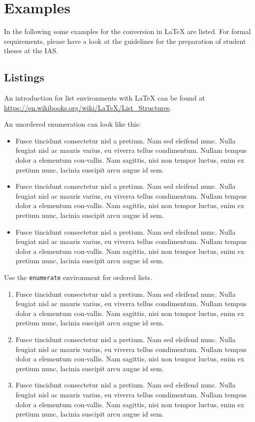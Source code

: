 \chapter{Examples}

In the following some examples for the conversion in \LaTeX{} are listed. For formal requirements, please have a look at the guidelines for the preparation of student theses at the \ac{IAS}.

\section{Listings}

An introduction for list environments with \LaTeX{} can be found at \url{https://en.wikibooks.org/wiki/LaTeX/List_Structures}.

An unordered enumeration can look like this:

\begin{itemize}
    \item Fusce tincidunt consectetur nisl a pretium. Nam sed eleifend nunc. Nulla feugiat nisl ac mauris varius, eu viverra tellus condimentum. Nullam tempus dolor a elementum con-vallis. Nam sagittis, nisi non tempor luctus, enim ex pretium nunc, lacinia suscipit arcu augue id sem.
    \item Fusce tincidunt consectetur nisl a pretium. Nam sed eleifend nunc. Nulla feugiat nisl ac mauris varius, eu viverra tellus condimentum. Nullam tempus dolor a elementum con-vallis. Nam sagittis, nisi non tempor luctus, enim ex pretium nunc, lacinia suscipit arcu augue id sem.
    \item Fusce tincidunt consectetur nisl a pretium. Nam sed eleifend nunc. Nulla feugiat nisl ac mauris varius, eu viverra tellus condimentum. Nullam tempus dolor a elementum con-vallis. Nam sagittis, nisi non tempor luctus, enim ex pretium nunc, lacinia suscipit arcu augue id sem.
\end{itemize}

Use the \texttt{enumerate} environment for ordered lists.

\begin{enumerate}
    \item Fusce tincidunt consectetur nisl a pretium. Nam sed eleifend nunc. Nulla feugiat nisl ac mauris varius, eu viverra tellus condimentum. Nullam tempus dolor a elementum con-vallis. Nam sagittis, nisi non tempor luctus, enim ex pretium nunc, lacinia suscipit arcu augue id sem.
    \item Fusce tincidunt consectetur nisl a pretium. Nam sed eleifend nunc. Nulla feugiat nisl ac mauris varius, eu viverra tellus condimentum. Nullam tempus dolor a elementum con-vallis. Nam sagittis, nisi non tempor luctus, enim ex pretium nunc, lacinia suscipit arcu augue id sem.
    \item Fusce tincidunt consectetur nisl a pretium. Nam sed eleifend nunc. Nulla feugiat nisl ac mauris varius, eu viverra tellus condimentum. Nullam tempus dolor a elementum con-vallis. Nam sagittis, nisi non tempor luctus, enim ex pretium nunc, lacinia suscipit arcu augue id sem.
\end{enumerate}

